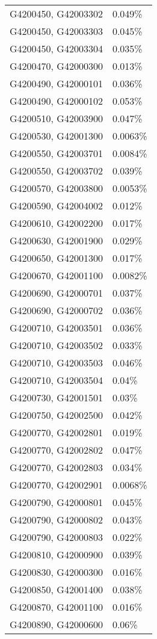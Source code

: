 \begin{longtable}[]{@{}ll@{}}
G4200450, G42003302 & 0.049\% \\
G4200450, G42003303 & 0.045\% \\
G4200450, G42003304 & 0.035\% \\
G4200470, G42000300 & 0.013\% \\
G4200490, G42000101 & 0.036\% \\
G4200490, G42000102 & 0.053\% \\
G4200510, G42003900 & 0.047\% \\
G4200530, G42001300 & 0.0063\% \\
G4200550, G42003701 & 0.0084\% \\
G4200550, G42003702 & 0.039\% \\
G4200570, G42003800 & 0.0053\% \\
G4200590, G42004002 & 0.012\% \\
G4200610, G42002200 & 0.017\% \\
G4200630, G42001900 & 0.029\% \\
G4200650, G42001300 & 0.017\% \\
G4200670, G42001100 & 0.0082\% \\
G4200690, G42000701 & 0.037\% \\
G4200690, G42000702 & 0.036\% \\
G4200710, G42003501 & 0.036\% \\
G4200710, G42003502 & 0.033\% \\
G4200710, G42003503 & 0.046\% \\
G4200710, G42003504 & 0.04\% \\
G4200730, G42001501 & 0.03\% \\
G4200750, G42002500 & 0.042\% \\
G4200770, G42002801 & 0.019\% \\
G4200770, G42002802 & 0.047\% \\
G4200770, G42002803 & 0.034\% \\
G4200770, G42002901 & 0.0068\% \\
G4200790, G42000801 & 0.045\% \\
G4200790, G42000802 & 0.043\% \\
G4200790, G42000803 & 0.022\% \\
G4200810, G42000900 & 0.039\% \\
G4200830, G42000300 & 0.016\% \\
G4200850, G42001400 & 0.038\% \\
G4200870, G42001100 & 0.016\% \\
G4200890, G42000600 & 0.06\% \\

\end{longtable}
